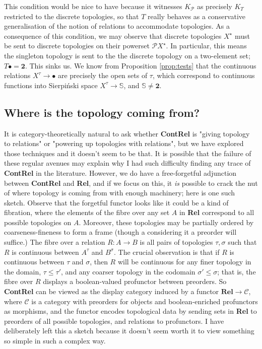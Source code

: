 \begin{fullwidth}
This condition would be nice to have because it witnesses $K_{\mathcal{P}}$ as precisely $K_T$ restricted to the discrete topologies, so that $T$ really behaves as a conservative generalisation of the notion of relations to accommodate topologies. As a consequence of this condition, we may observe that discrete topologies $X^\star$ must be sent to discrete topologies on their powerset $\mathcal{P}X^\star$. In particular, this means the singleton topology is sent to the the discrete topology on a two-element set; $T\bullet = \textbf{2}$. This sinks us. We know from Proposition \ref{prop:tests} that the continuous relations $X^\tau \rightarrow \bullet$ are precisely the open sets of $\tau$, which correspond to continuous functions into Sierpi\'{n}ski space $X^\tau \rightarrow \mathbb{S}$, and $\mathbb{S} \neq \textbf{2}$.

\subsection{Where is the topology coming from?}

It is category-theoretically natural to ask whether \textbf{ContRel} is "giving topology to relations" or "powering up topologies with relations", but we have explored those techniques and it doesn't seem to be that. It is possible that the failure of these regular avenues may explain why I had such difficulty finding any trace of \textbf{ContRel} in the literature. However, we do have a free-forgetful adjunction between \textbf{ContRel} and \textbf{Rel}, and if we focus on this, it \emph{is} possible to crack the nut of where topology is coming from with enough machinery; here is one such sketch. Observe that the forgetful functor looks like it could be a kind of fibration, where the elements of the fibre over any set $A$ in \textbf{Rel} correspond to all possible topologies on $A$. Moreover, these topologies may be partially ordered by coarseness-fineness to form a frame (though a considering it a preorder will suffice.) The fibre over a relation $R: A \rightarrow B$ is all pairs of topologies $\tau, \sigma$ such that $R$ is continuous between $A^\tau$ and $B^\sigma$. The crucial observation is that if $R$ is continuous between $\tau$ and $\sigma$, then $R$ will be continuous for any finer topology in the domain, $\tau \leq \tau'$, and any coarser topology in the codomain $\sigma' \leq \sigma$; that is, the fibre over $R$ displays a boolean-valued profunctor between preorders. So \textbf{ContRel} can be viewed as the display category induced by a functor $\textbf{Rel} \rightarrow \mathcal{C}$, where $\mathcal{C}$ is a category with preorders for objects and boolean-enriched profunctors as morphisms, and the functor encodes topological data by sending sets in \textbf{Rel} to preorders of all possible topologies, and relations to profunctors. I have deliberately left this a sketch because it doesn't seem worth it to view something so simple in such a complex way.


\end{fullwidth}
